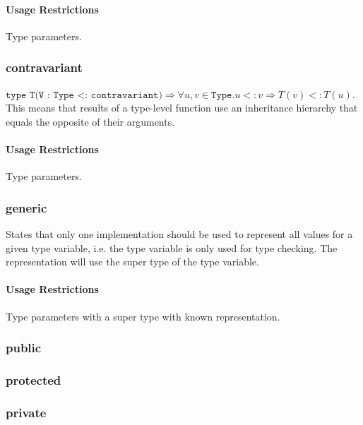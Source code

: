 \paragraph{Usage Restrictions}
Type parameters.


\subsubsection{contravariant}

$\texttt{type T(V : Type <: contravariant)} \Rightarrow \forall u,v \in \texttt{Type}. u <: v \Rightarrow T(v) <: T(u)$.
This means that results of a type-level function use an inheritance hierarchy that equals the opposite of their arguments.

\paragraph{Usage Restrictions}
Type parameters.


\subsubsection{generic}
States that only one implementation should be used to represent all values for a given type variable, i.e. the type variable is only used for type checking.
The representation will use the super type of the type variable.

\paragraph{Usage Restrictions}
Type parameters with a super type with known representation.

\subsubsection{public}
\subsubsection{protected}
\subsubsection{private}
